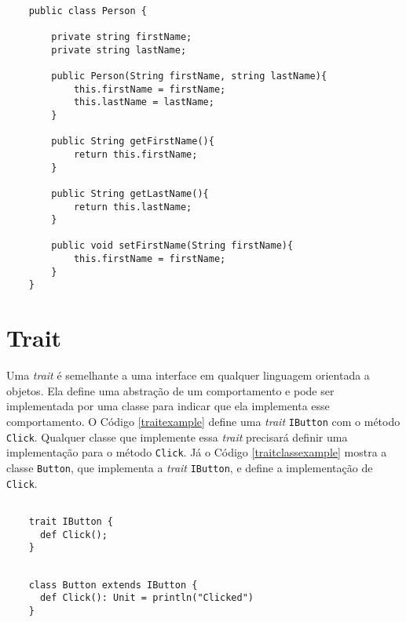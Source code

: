 \begin{lstlisting}[caption={Construtor Simples em Java.},label=javaimmutableattr]

    public class Person {
        
        private string firstName;
        private string lastName;
        
        public Person(String firstName, string lastName){
            this.firstName = firstName;
            this.lastName = lastName;
        }
        
        public String getFirstName(){
            return this.firstName;
        }
        
        public String getLastName(){
            return this.lastName;
        }
        
        public void setFirstName(String firstName){
            this.firstName = firstName;
        }
    }

\end{lstlisting}


\section{Trait}

Uma \textit{trait} é semelhante a uma interface em qualquer 
linguagem orientada a objetos. Ela define uma abstração 
de um comportamento e pode ser implementada por uma 
classe para indicar que ela implementa esse comportamento.\cite{ordesky2008} 
O Código \ref{traitexample} define uma \textit{trait} \texttt{IButton} com 
o método \texttt{Click}. Qualquer classe que implemente essa \textit{trait} 
precisará definir uma implementação para o método \texttt{Click}. 
Já o Código \ref{traitclassexample} mostra a classe 
\texttt{Button}, que implementa a \textit{trait} \texttt{IButton}, 
e define a implementação de \texttt{Click}.

\begin{lstlisting}[caption={Exemplo de \textit{trait}.},label=traitexample]

    trait IButton {
      def Click();
    }

\end{lstlisting}

\begin{lstlisting}[caption={Exemplo de classe que implementa uma \textit{trait}.},label=traitclassexample]

    class Button extends IButton {
      def Click(): Unit = println("Clicked")
    }

\end{lstlisting}

